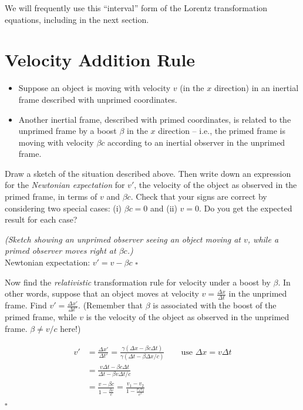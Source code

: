 \documentclass[11pt, letterpaper, openany]{book}
\newenvironment{exercise}[1][Exercise]{%
  \tcolorbox[blanker, breakable, left=1em,
    before skip=1em, after skip=1em,
    borderline west={3pt}{0pt}{PhysNavy},
    colback=PhysCream,
    before upper={\textcolor{PhysNavy}{\sffamily\bfseries #1:}\space}
  ]%
}{%
  \endtcolorbox%
}
\newenvironment{solution}[1][Solution]{%
  \tcolorbox[blanker, breakable, left=1em,
    before skip=1em, after skip=1em,
    borderline west={2pt}{0pt}{PhysTeal},
    colback=PhysCream,
    before upper={\textcolor{PhysTeal}{\sffamily\bfseries #1.}\space}
  ]%
}{%
  \hfill\textcolor{PhysTeal}{\ensuremath{\square}}\endtcolorbox%
}
\begin{document}
We will frequently use this ``interval'' form of the Lorentz transformation equations, including in the next section.

\section{Velocity Addition Rule}

\begin{itemize}
    \item Suppose an object is moving with velocity $v$ (in the $x$ direction) in an inertial frame described with unprimed coordinates.
    \item Another inertial frame, described with primed coordinates, is related to the unprimed frame by a boost $\beta$ in the $x$ direction -- i.e., the primed frame is moving with velocity $\beta c$ according to an inertial observer in the unprimed frame.
\end{itemize}

\begin{exercise}[Quick Exercise 10]
Draw a sketch of the situation described above. Then write down an expression for the \textit{Newtonian expectation} for $v'$, the velocity of the object as observed in the primed frame, in terms of $v$ and $\beta c$. Check that your signs are correct by considering two special cases: (i) $\beta c = 0$ and (ii) $v = 0$. Do you get the expected result for each case?
\end{exercise}
\begin{solution}
\textit{(Sketch showing an unprimed observer seeing an object moving at $v$, while a primed observer moves right at $\beta c$.)} \\
Newtonian expectation: $v' = v - \beta c$
\end{solution}

\begin{exercise}[Exercise 11]
Now find the \textit{relativistic} transformation rule for velocity under a boost by $\beta$. In other words, suppose that an object moves at velocity $v = \frac{\Delta x}{\Delta t}$ in the unprimed frame. Find $v' = \frac{\Delta x'}{\Delta t'}$. (Remember that $\beta$ is associated with the boost of the primed frame, while $v$ is the velocity of the object as observed in the unprimed frame. $\beta \neq v/c$ here!)
\end{exercise}
\begin{solution}
\begin{align*}
    v' &= \frac{\Delta x'}{\Delta t'} = \frac{\gamma(\Delta x - \beta c \Delta t)}{\gamma(\Delta t - \beta \Delta x / c)} \qquad \text{use } \Delta x = v\Delta t \\
       &= \frac{v\Delta t - \beta c \Delta t}{\Delta t - \beta v \Delta t / c} \\
       &= \frac{v - \beta c}{1 - \frac{\beta v}{c}} = \frac{v_1 - v_2}{1 - \frac{v_1 v_2}{c^2}}
\end{align*}
\end{solution}
\end{document}
